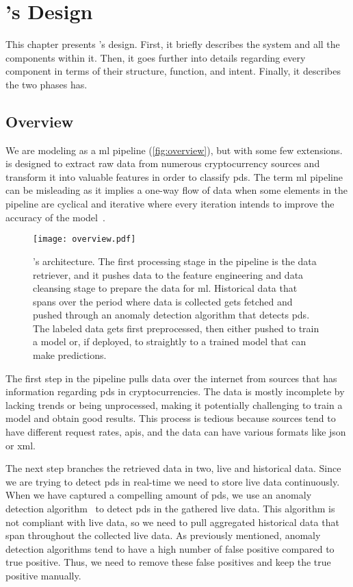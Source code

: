 \chapter{\project's Design}\label{ch:design}\glsresetall
This chapter presents \project's design. First, it briefly describes the system and all the components within it. Then, it goes further into details regarding every component in terms of their structure, function, and intent. Finally, it describes the two phases \project has.

\section{Overview}
We are modeling \project as a \ac{ml} pipeline (\autoref{fig:overview}), but with some few extensions. \project is designed to extract raw data from numerous cryptocurrency sources and transform it into valuable features in order to classify \acp{pd}. The term \ac{ml} pipeline can be misleading as it implies a one-way flow of data when some elements in the pipeline are cyclical and iterative where every iteration intends to improve the accuracy of the model~\cite{ml_pipeline_3}.

\begin{figure}[ht]
    \centering
    \texttt{[image: overview.pdf]}
    \caption[\project's architecture]{\project's architecture. The first processing stage in the pipeline is the data retriever, and it pushes data to the feature engineering and data cleansing stage to prepare the data for \ac{ml}. Historical data that spans over the period where data is collected gets fetched and pushed through an anomaly detection algorithm that detects \acp{pd}. The labeled data gets first preprocessed, then either pushed to train a model or, if deployed, to straightly to a trained model that can make predictions.}
    \label{fig:overview}
\end{figure}

The first step in the pipeline pulls data over the internet from sources that has information regarding \acp{pd} in cryptocurrencies. The data is mostly incomplete by lacking trends or being unprocessed, making it potentially challenging to train a model and obtain good results. This process is tedious because sources tend to have different request rates, \acp{api}, and the data can have various formats like \ac{json} or \ac{xml}.

The next step branches the retrieved data in two, live and historical data. Since we are trying to detect \acp{pd} in real-time we need to store live data continuously. When we have captured a compelling amount of \acp{pd}, we use an anomaly detection algorithm~\cite{P&D_to_the_moon} to detect \acp{pd} in the gathered live data. This algorithm is not compliant with live data, so we need to pull aggregated historical data that span throughout the collected live data. As previously mentioned, anomaly detection algorithms tend to have a high number of false positive compared to true positive. Thus, we need to remove these false positives and keep the true positive manually.

